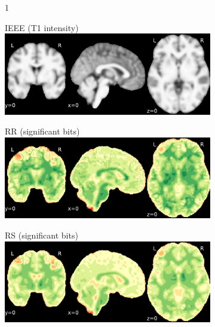 \documentclass{article}
\begin{document}
\begin{landscape}
    \begin{figure}

        \vspace*{-2cm}
        \centering
        \begin{subfigure}[b][][c]{0.01\paperwidth} 1 \vspace*{-45pt} \end{subfigure}
        \begin{subfigure}[t]{0.2\paperheight}
            \centering
            IEEE (T1 intensity)
            \includegraphics[width=\textwidth]{figures/ieee_T1/fwhm_5/ieee_ds001600_sub-1.pdf}
        \end{subfigure}
        \begin{subfigure}[t]{0.2\paperheight}
            \centering
            RR (significant bits)
            \includegraphics[width=\textwidth]{figures/sig/fwhm_5/rr_ds001600_sub-1_sig.pdf}
        \end{subfigure}
        \begin{subfigure}[t]{0.2\paperheight}
            \centering
            RS (significant bits)
            \includegraphics[width=\textwidth]{figures/sig/fwhm_5/rs_ds001600_sub-1_sig.pdf}

\end{subfigure}
\end{figure}
\end{landscape}
\end{document}
